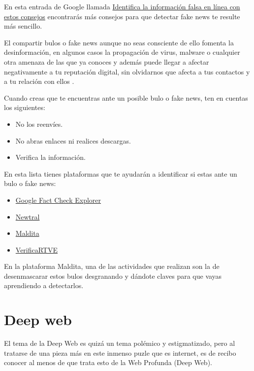 \documentclass[
  spanish,
  a4paper,
  openany]{book}
\begin{document}
En esta entrada de Google llamada \href{https://blog.google/products/news/consejos-verificacion-hechos/}{Identifica la información falsa en línea con estos consejos} encontrarás más consejos para que detectar fake news te resulte más sencillo.

El compartir bulos o fake news aunque no seas consciente de ello fomenta la desinformación, en algunos casos la propagación de virus, malware o cualquier otra amenaza de las que ya conoces y además puede llegar a afectar negativamente a tu reputación digital, sin olvidarnos que afecta a tus contactos y a tu relación con ellos \citep{OSI-frena-evita-bulos}.

Cuando creas que te encuentras ante un posible bulo o fake news, ten en cuentas los siguientes:

\begin{itemize}
\item
  No los reenvíes.
\item
  No abras enlaces ni realices descargas.
\item
  Verifica la información.
\end{itemize}

En esta lista tienes plataformas que te ayudarán a identificar si estas ante un bulo o fake news:

\begin{itemize}
\item
  \href{https://toolbox.google.com/factcheck/explorer}{Google Fact Check Explorer}
\item
  \href{https://www.newtral.es/zona-verificacion/fact-check/}{Newtral}
\item
  \href{https://maldita.es/malditobulo/1}{Maldita}
\item
  \href{https://www.rtve.es/noticias/verificartve/}{VerificaRTVE}
\end{itemize}

En la plataforma Maldita, una de las actividades que realizan son la de desenmascarar estos bulos desgranando y dándote claves para que vayas aprendiendo a detectarlos.

\hypertarget{deep-web}{%
\section{Deep web}\label{deep-web}}

El tema de la Deep Web es quizá un tema polémico y estigmatizado, pero al tratarse de una pieza más en este inmenso puzle que es internet, es de recibo conocer al menos de que trata esto de la Web Profunda (Deep Web).
\end{document}
